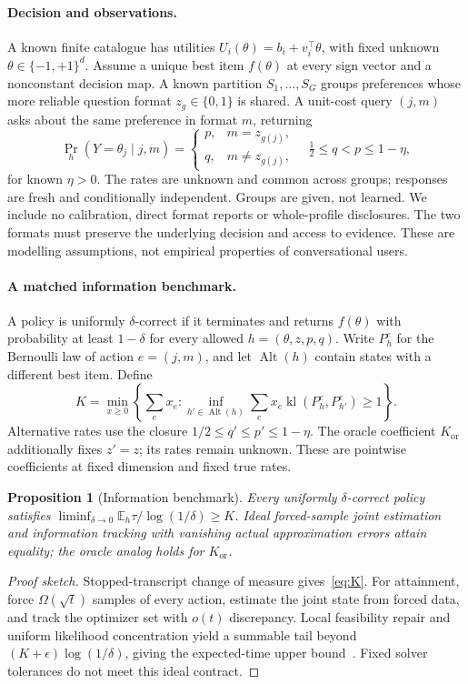\documentclass[sigconf,anonymous,review]{acmart}
\newtheorem{proposition}[theorem]{Proposition}
\newcommand{\kl}{\operatorname{kl}}
\newcommand{\E}{\mathbb E}
\newcommand{\Kor}{K_{\mathrm{or}}}
\begin{document}
\paragraph{Decision and observations.}
A known finite catalogue has utilities $U_i(\theta)=b_i+v_i^\top\theta$, with fixed unknown $\theta\in\{-1,+1\}^d$. Assume a unique best item $f(\theta)$ at every sign vector and a nonconstant decision map. A known partition $S_1,\ldots,S_G$ groups preferences whose more reliable question format $z_g\in\{0,1\}$ is shared. A unit-cost query $(j,m)$ asks about the same preference in format $m$, returning
\begin{equation}\label{eq:channel}
 \Pr_h(Y=\theta_j\mid j,m)=
 \begin{cases}p,&m=z_{g(j)},\\q,&m\ne z_{g(j)},\end{cases}
 \quad \tfrac12\le q<p\le1-\eta,
\end{equation}
for known $\eta>0$. The rates are unknown and common across groups; responses are fresh and conditionally independent. Groups are given, not learned. We include no calibration, direct format reports or whole-profile disclosures. The two formats must preserve the underlying decision and access to evidence. These are modelling assumptions, not empirical properties of conversational users.

\paragraph{A matched information benchmark.}
A policy is uniformly $\delta$-correct if it terminates and returns $f(\theta)$ with probability at least $1-\delta$ for every allowed $h=(\theta,z,p,q)$. Write $P_h^e$ for the Bernoulli law of action $e=(j,m)$, and let $\operatorname{Alt}(h)$ contain states with a different best item. Define
\begin{equation}\label{eq:K}
 K=\min_{x\ge0}\left\{\sum_e x_e:
 \inf_{h'\in\operatorname{Alt}(h)}\sum_e x_e\kl(P_h^e,P_{h'}^e)\ge1\right\}.
\end{equation}
Alternative rates use the closure $1/2\le q'\le p'\le1-\eta$. The oracle coefficient $\Kor$ additionally fixes $z'=z$; its rates remain unknown. These are pointwise coefficients at fixed dimension and fixed true rates.
\begin{proposition}[Information benchmark]\label{prop:framework}
Every uniformly $\delta$-correct policy satisfies
$\liminf_{\delta\to0}\E_h\tau/\log(1/\delta)\ge K$.
Ideal forced-sample joint estimation and information tracking with vanishing actual approximation errors attain equality; the oracle analog holds for $\Kor$.
\end{proposition}
\begin{proof}[Proof sketch]
Stopped-transcript change of measure gives~\eqref{eq:K}. For attainment, force $\Omega(\sqrt t)$ samples of every action, estimate the joint state from forced data, and track the optimizer set with $o(t)$ discrepancy. Local feasibility repair and uniform likelihood concentration yield a summable tail beyond $(K+\epsilon)\log(1/\delta)$, giving the expected-time upper bound~\cite{deshmukh2019}. Fixed solver tolerances do not meet this ideal contract.
\end{proof}
\end{document}
